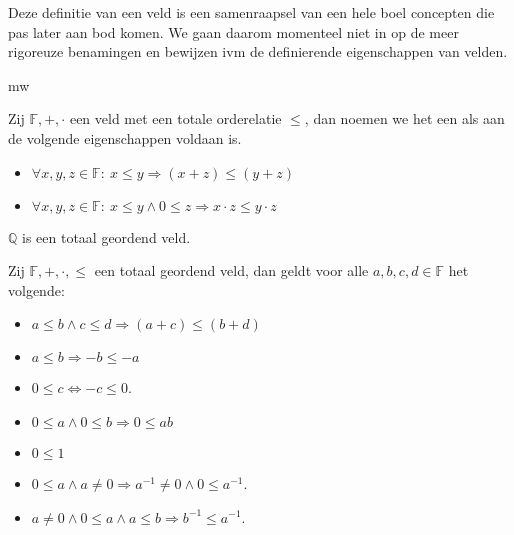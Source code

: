 \documentclass[main.tex]{subfiles}
\begin{document}
\begin{opm}
  Deze definitie van een veld is een samenraapsel van een hele boel concepten die pas later aan bod komen.
  We gaan daarom momenteel niet in op de meer rigoreuze benamingen en bewijzen ivm de definierende eigenschappen van velden.
\end{opm}
                                 mw
\begin{de}
  Zij $\mathbb{F},+,\cdot$ een veld met een totale orderelatie $\le$, dan noemen we het een  als aan de volgende eigenschappen voldaan is.
  \begin{itemize}
  \item $\forall x,y,z \in \mathbb{F}:\ x \le y \Rightarrow (x+z) \le (y+z)$
  \item $\forall x,y,z \in \mathbb{F}:\ x \le y \wedge 0 \le z \Rightarrow x\cdot z \le y\cdot z$
  \end{itemize}
\end{de}

\begin{pr}
  $\mathbb{Q}$ is een totaal geordend veld.

\end{pr}

\begin{pr}
  Zij $\mathbb{F},+,\cdot,\le$ een totaal geordend veld, dan geldt voor alle $a,b,c,d \in \mathbb{F}$ het volgende:
  \begin{itemize}
  \item $a\le b \wedge c \le d \Rightarrow (a+c) \le (b+d)$
  \item $a \le b \Rightarrow -b \le -a$
  \item $0 \le c \Leftrightarrow -c \le 0$.
  \item $0 \le a \wedge 0 \le b \Rightarrow 0 \le ab$
  \item $0 \le 1$
  \item $0 \le a \wedge a \neq 0 \Rightarrow a^{-1} \neq 0 \wedge 0 \le a^{-1}$.
  \item $a \neq 0 \wedge 0 \le a \wedge a \le b \Rightarrow b^{-1} \le a^{-1}$.
  \end{itemize}

\end{pr}

\end{document}
